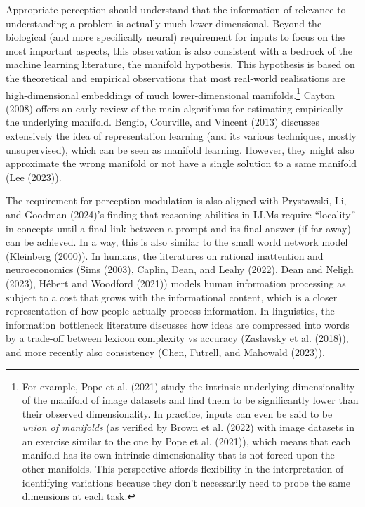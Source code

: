 \documentclass[
]{article}
\theoremstyle{plain}
\theoremstyle{definition}
\theoremstyle{remark}
\begin{document}
Appropriate perception should understand that the information of
relevance to understanding a problem is actually much lower-dimensional.
Beyond the biological (and more specifically neural) requirement for
inputs to focus on the most important aspects, this observation is also
consistent with a bedrock of the machine learning literature, the
manifold hypothesis. This hypothesis is based on the theoretical and
empirical observations that most real-world realisations are
high-dimensional embeddings of much lower-dimensional
manifolds.\footnote{For example, Pope et al. (2021) study the intrinsic
  underlying dimensionality of the manifold of image datasets and find
  them to be significantly lower than their observed dimensionality. In
  practice, inputs can even be said to be \emph{union of manifolds} (as
  verified by Brown et al. (2022) with image datasets in an exercise
  similar to the one by Pope et al. (2021)), which means that each
  manifold has its own intrinsic dimensionality that is not forced upon
  the other manifolds. This perspective affords flexibility in the
  interpretation of identifying variations because they don't
  necessarily need to probe the same dimensions at each task.} Cayton
(2008) offers an early review of the main algorithms for estimating
empirically the underlying manifold. Bengio, Courville, and Vincent
(2013) discusses extensively the idea of representation learning (and
its various techniques, mostly unsupervised), which can be seen as
manifold learning. However, they might also approximate the wrong
manifold or not have a single solution to a same manifold (Lee (2023)).

The requirement for perception modulation is also aligned with
Prystawski, Li, and Goodman (2024)'s finding that reasoning abilities in
LLMs require ``locality'' in concepts until a final link between a
prompt and its final answer (if far away) can be achieved. In a way,
this is also similar to the small world network model (Kleinberg
(2000)). In humans, the literatures on rational inattention and
neuroeconomics (Sims (2003), Caplin, Dean, and Leahy (2022), Dean and
Neligh (2023), Hébert and Woodford (2021)) models human information
processing as subject to a cost that grows with the informational
content, which is a closer representation of how people actually process
information. In linguistics, the information bottleneck literature
discusses how ideas are compressed into words by a trade-off between
lexicon complexity vs accuracy (Zaslavsky et al. (2018)), and more
recently also consistency (Chen, Futrell, and Mahowald (2023)).
\end{document}

